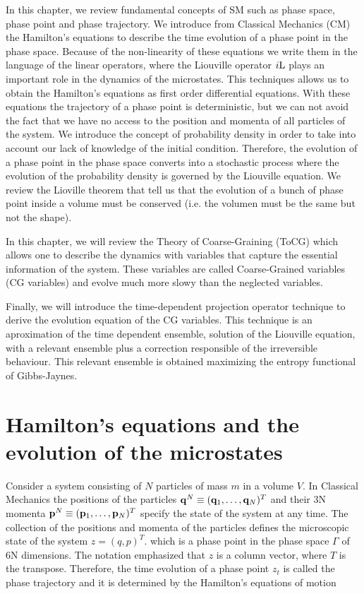 \documentclass[a4paper,openright,12pt]{book}
\begin{document}
In this chapter, we review fundamental concepts of SM such as phase space, phase point and phase trajectory.
We introduce from Classical Mechanics (CM) the Hamilton's equations to describe the time evolution of a phase point in the phase space. 
Because of the non-linearity of these equations we write them in the language of the linear operators, where the Liouville operator $i{\rm L}$ plays an important role in the dynamics of the microstates. 
This techniques allows us to obtain the Hamilton's equations as first order differential equations. 
With these equations the trajectory of a phase point is deterministic, but we can not avoid the fact that we have no access to the position and momenta of all particles of the system. 
We introduce the concept of probability density in order to take into account our lack of knowledge of the initial condition. 
Therefore, the evolution of a phase point in the phase space converts into a stochastic process where the evolution of the probability density  is governed by the Liouville equation.
We review the Lioville theorem that tell us that the evolution of a bunch of phase point inside a volume must be conserved (i.e. the volumen must be the same but not the shape). 

In this chapter, we will review the Theory of Coarse-Graining (ToCG) which allows one to describe the dynamics with variables that capture the essential information of the system. 
These variables are called Coarse-Grained variables (CG variables) and evolve much more slowy than the neglected variables. 

Finally, we will introduce the time-dependent projection operator technique to derive the evolution equation of the CG variables. This technique is an aproximation of the time dependent ensemble, solution of the Liouville equation, with a relevant ensemble plus a correction responsible of the irreversible behaviour. This relevant ensemble is obtained maximizing the entropy functional of Gibbs-Jaynes. 


\section{Hamilton's equations and the evolution of the microstates}
Consider a system consisting of $N$ particles of mass $m$ in a volume $V$. In Classical Mechanics the positions of the particles ${\bf q}^N\equiv ({\bf q}_1,\dots,{\bf q}_N)^T$ and their 3N momenta ${\bf p}^N\equiv ({\bf p}_1,\dots,{\bf p}_N)^T$ specify the state of the system at any time. 
The collection of the positions and momenta of the particles defines the microscopic state of the system $z=(q,p)^T$. which is a phase point in the phase space $\Gamma$ of 6N dimensions. The notation emphasized that $z$ is a column vector, where $T$ is the transpose. Therefore, the time evolution of a phase point $z_t$ is called the phase trajectory and it is determined by the Hamilton's equations of motion
\end{document}
